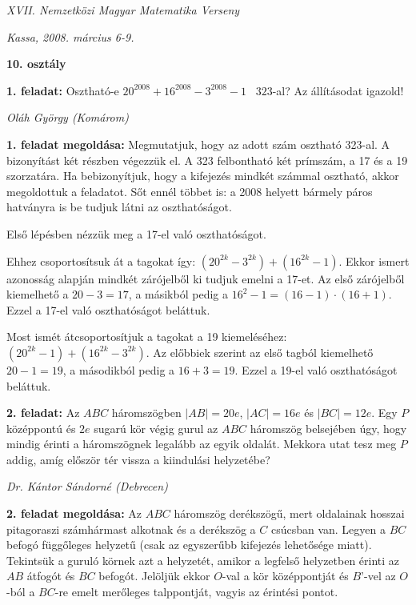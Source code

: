 \documentclass[a4paper,10pt]{article}
\def\ki#1#2{\hfill {\it #1 (#2)}\medskip}
\begin{document}
\begin{center} \Large {\em XVII. Nemzetközi Magyar Matematika Verseny} \end{center}
\begin{center} \large{\em Kassa, 2008. március 6-9.} \end{center}
\smallskip
\begin{center} \large{\bf 10. osztály} \end{center}
\bigskip 

{\bf 1. feladat: } Osztható-e $20^{2008}+16^{2008}-3^{2008}-1$  \  $323$-al? Az állításodat igazold!

\ki{Oláh György}{Komárom}

\medskip
{\bf 1. feladat megoldása: } Megmutatjuk, hogy az adott szám osztható 323-al. A bizonyítást két
részben végezzük el. A 323 felbontható két prímszám, a 17 és a 19
szorzatára. Ha bebizonyítjuk, hogy a kifejezés mindkét számmal
osztható, akkor megoldottuk a feladatot.
Sőt ennél többet is: a 2008 helyett bármely páros hatványra is
be tudjuk látni az oszthatóságot.

Első lépésben nézzük meg a 17-el való oszthatóságot. 

Ehhez
csoportosítsuk át a tagokat így: $\left(20^{2k}-3^{2k}\right)+\left(16^{2k}-1\right)$.
Ekkor ismert azonosság alapján mindkét zárójelből ki tudjuk emelni a
17-et. Az első zárójelből kiemelhető a $20-3= 17$, a másikból pedig a
$16^2-1= (16-1)\cdot(16+1)$. Ezzel a 17-el való oszthatóságot beláttuk.

Most ismét átcsoportosítjuk a tagokat a 19
kiemeléséhez: $\left(20^{2k}-1\right)+\left(16^{2k}-3^{2k}\right)$. Az előbbiek szerint az első tagból
kiemelhető $20-1=19$, a másodikból pedig a $16+3=19$. Ezzel a 19-el
való oszthatóságot beláttuk.



\medskip
{\bf 2. feladat: } Az $ABC$ háromszögben $|AB|=20e$, $|AC|=16e$  és 
$|BC|=12e$. Egy $P$ középpontú és $2e$ sugarú kör végig gurul az $ABC$ háromszög belsejében úgy, hogy mindig érinti a háromszögnek legalább az egyik oldalát. Mekkora utat tesz meg $P$ addig, amíg először tér vissza a kiindulási helyzetébe? 

\ki{Dr. Kántor Sándorné}{Debrecen}\medskip

{\bf 2. feladat megoldása: } Az $ABC$ háromszög derékszögű, mert oldalainak hosszai pitagoraszi
számhármast alkotnak és a derékszög a $C$ csúcsban van.
Legyen a $BC$ befogó függőleges helyzetű (csak az egyszerűbb
kifejezés lehetősége miatt). Tekintsük a guruló körnek azt a helyzetét,
amikor a legfelső helyzetben érinti az $AB$ átfogót és $BC$ befogót.
Jelöljük ekkor $O$-val a kör középpontját és $B’$-vel az $O$-ból a $BC$-re
emelt merőleges talppontját, vagyis az érintési pontot.
\end{document}
